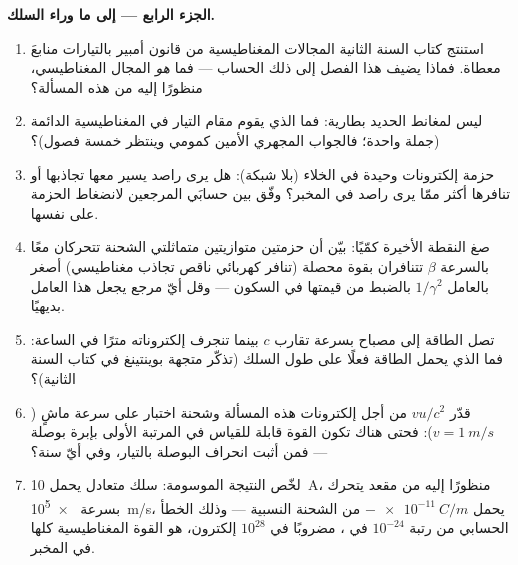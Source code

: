 \begin{problem}
\medskip\noindent\textbf{الجزء الرابع --- إلى ما وراء السلك.}
\begin{enumerate}[resume]
  \item استنتج كتاب السنة الثانية المجالات المغناطيسية من
        قانون أمبير بالتيارات منابعَ معطاة. فماذا يضيف هذا الفصل
        إلى ذلك الحساب --- فما \emph{هو} المجال المغناطيسي،
        منظورًا إليه من هذه المسألة؟
  \item ليس لمغانط الحديد بطارية: فما الذي يقوم مقام
        التيار في المغناطيسية الدائمة (جملة واحدة؛ فالجواب
        المجهري الأمين كمومي وينتظر خمسة فصول)؟
  \item حزمة إلكترونات وحيدة في الخلاء (بلا شبكة): هل يرى
        راصد يسير معها تجاذبها أو تنافرها أكثر ممّا يرى
        راصد في المخبر؟ وفّق بين حسابَي المرجعين لانضغاط
        الحزمة على نفسها.
  \item صغ النقطة الأخيرة كمّيًا: بيّن أن حزمتين متوازيتين
        متماثلتي الشحنة تتحركان معًا بالسرعة $\beta$ تتنافران بقوة
        محصلة (تنافر كهربائي ناقص تجاذب مغناطيسي)
        أصغر بالعامل $1/\gamma^2$ بالضبط من قيمتها في السكون ---
        وقل أيّ مرجع يجعل هذا العامل بديهيًا.
  \item تصل الطاقة إلى مصباح بسرعة تقارب $c$ بينما تنجرف
        إلكتروناته مترًا في الساعة: فما الذي يحمل الطاقة
        فعلًا على طول السلك (تذكّر متجهة بوينتينغ في كتاب
        السنة الثانية)؟
  \item قدّر $vu/c^2$ من أجل إلكترونات هذه المسألة وشحنة
        اختبار على سرعة ماشٍ ($v = \qty{1}{m/s}$): فحتى هناك تكون
        القوة قابلة للقياس في المرتبة الأولى بإبرة بوصلة ---
        فمن أثبت انحراف البوصلة بالتيار، وفي أيّ سنة؟
  \item لخّص النتيجة الموسومة: سلك متعادل يحمل \qty{10}{A}،
        منظورًا إليه من مقعد يتحرك بسرعة \qty{e5}{m/s}، يحمل
        $-\qty{e-11}{C/m}$ من الشحنة النسبية --- وذلك الخطأ
        الحسابي من رتبة $10^{-24}$ في ، مضروبًا في
        $10^{28}$ إلكترون، هو القوة المغناطيسية كلها في المخبر.
\end{enumerate}
\end{problem}

